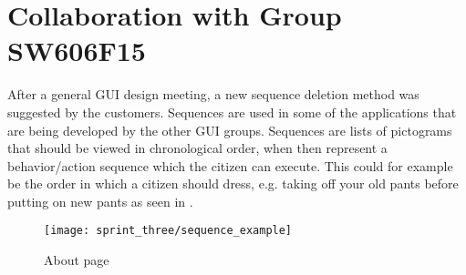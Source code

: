 \section{Collaboration with Group SW606F15}
\label{sec:collaboration_with_group_sw606f15}

After a general GUI design meeting, a new sequence deletion method was suggested by the customers. Sequences are used in some of the applications that are being developed by the other GUI groups. Sequences are lists of pictograms that should be viewed in chronological order, when then represent a behavior/action sequence which the citizen can execute. This could for example be the order in which a citizen should dress, e.g. taking off your old pants before putting on new pants as seen in .

\begin{figure}[!htbp]
	\centering
	\texttt{[image: sprint\_three/sequence\_example]}
	\caption{About page}
	\label{fig:sequence_example}
\end{figure}


